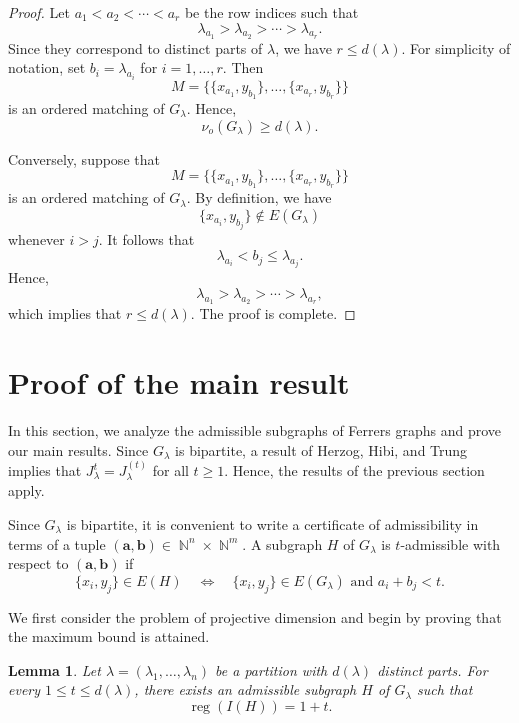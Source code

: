 \documentclass[12pt,amscd]{amsart}
\newtheorem{lem}[thm]{Lemma}
\theoremstyle{definition}
\numberwithin{equation}{section}
\DeclareMathOperator{\NN}{\mathbb {N}}
\DeclareMathOperator{\reg}{reg}
\def\a {\mathbf a}
\def\b {\mathbf b}
\begin{document}
\begin{proof}
Let
\( a_1 < a_2 < \cdots < a_r
\) be the row indices such that
\[
\lambda_{a_1} > \lambda_{a_2} > \cdots > \lambda_{a_r}.
\]
Since they correspond to distinct parts of $\lambda$, we have $r \le d(\lambda)$. For simplicity of notation, set \(b_i = \lambda_{a_i}
\) for $i = 1, \ldots, r$. Then
\[
M = \{\{x_{a_1}, y_{b_1}\}, \ldots, \{x_{a_r}, y_{b_r}\}\}
\]
is an ordered matching of $G_\lambda$. Hence,
\[
\nu_o(G_\lambda) \ge d(\lambda).
\]

Conversely, suppose that
\[
M = \{\{x_{a_1}, y_{b_1}\}, \ldots, \{x_{a_r}, y_{b_r}\}\}
\]
is an ordered matching of $G_\lambda$. By definition, we have
\[
\{x_{a_i}, y_{b_j}\} \notin E(G_\lambda)
\]
whenever $i > j$. It follows that
\[
\lambda_{a_i} < b_j \le \lambda_{a_j}.
\]
Hence,
\[
\lambda_{a_1} > \lambda_{a_2} > \cdots > \lambda_{a_r},
\]
which implies that $r \le d(\lambda)$. The proof is complete.
\end{proof}

\section{Proof of the main result}\label{sec_app}
In this section, we analyze the admissible subgraphs of Ferrers graphs and prove our main results. Since $G_\lambda$ is bipartite, a result of Herzog, Hibi, and Trung \cite{HHT} implies that
\(
J_\lambda^t = J_\lambda^{(t)}
\)
for all $t \ge 1$. Hence, the results of the previous section apply.

Since $G_\lambda$ is bipartite, it is convenient to write a certificate of admissibility in terms of a tuple
\(
(\a,\b) \in \NN^n \times \NN^m.
\) A subgraph $H$ of $G_\lambda$ is $t$-admissible with respect to $(\a,\b)$ if
\[
\{x_i,y_j\} \in E(H)
\quad \Longleftrightarrow \quad
\{x_i,y_j\} \in E(G_\lambda)
\text{ and } a_i + b_j < t.
\]

We first consider the problem of projective dimension and begin by proving that the maximum bound is attained.
\begin{lem}\label{lem_max_bound_pd}
Let $\lambda = (\lambda_1,\ldots,\lambda_n)$ be a partition with $d(\lambda)$ distinct parts. For every $1 \le t \le d(\lambda)$, there exists an admissible subgraph $H$ of $G_\lambda$ such that
\[
\reg (I(H)) = 1 + t.
\]
\end{lem}
\end{document}
